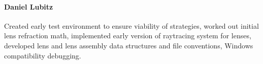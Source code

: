 \documentclass[twocolumn]{article}
\begin{document}
\paragraph{Daniel Lubitz}
Created early test environment to ensure viability of strategies,
worked out initial lens refraction math,
implemented early version of raytracing system for lenses,
developed lens and lens assembly data structures and file conventions,
Windows compatibility debugging.



\end{document}
